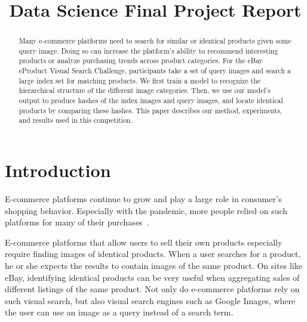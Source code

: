 \documentclass[conference]{IEEEtran}
\begin{document}
\title{Data Science Final Project Report}
\author{
}

\maketitle
\begin{abstract}
	Many e-commerce platforms need to search for similar or identical products
	given some query image.
	Doing so can increase the platform's ability to recommend interesting 
	products or analyze purchasing trends across product categories.
	For the eBay eProduct Visual Search Challenge, participants take a set
	of query images and search a large index set for matching products.
	We first train a model to recognize the hierarchical structure of the different
	image categories.
	Then, we use our model's output to produce hashes of the index images
	and query images, and locate identical products by comparing these hashes.
	This paper describes our method, experiments, and results used in this
	competition.
\end{abstract}

\section{Introduction}
E-commerce platforms continue to grow and play a large role in consumer's
shopping behavior.
Especially with the pandemic, more people relied on such platforms for 
many of their purchases~\cite{jilkova2021digital}.

E-commerce platforms that allow users to sell their own products especially
require finding images of identical products.
When a user searches for a product, he or she expects the results to contain
images of the same product.
On sites like eBay, identifying identical products can be very useful when 
aggregating sales of different listings of the same product.
Not only do e-commerce platforms rely on such visual search, but also visual
search engines such as Google Images, where the user can use an image as a query
instead of a search term.
\end{document}
